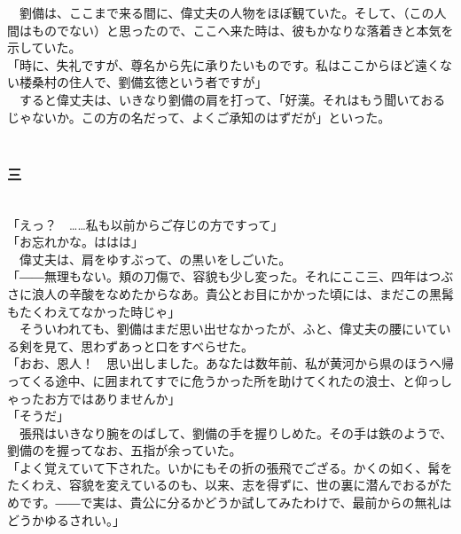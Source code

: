 \documentclass[
  paper=a5,
  fontsize=10pt,
  jafontsize=9.5pt,
  tate,                  %
  open_bracket_pos=nibu, %
]{jlreq}
\begin{document}
　劉備は、ここまで来る間に、偉丈夫の人物をほぼ観ていた。そして、（この人間はものでない）と思ったので、ここへ来た時は、彼もかなりな落着きと本気を示していた。\\


「時に、失礼ですが、尊名から先に承りたいものです。私はここからほど遠くない楼桑村の住人で、劉備玄徳という者ですが」\\


　すると偉丈夫は、いきなり劉備の肩を打って、「好漢。それはもう聞いておるじゃないか。この方の名だって、よくご承知のはずだが」といった。\\

\\

\subsubsection{三}

\\


「えっ？　……私も以前からご存じの方ですって」\\


「お忘れかな。ははは」\\


　偉丈夫は、肩をゆすぶって、の黒いをしごいた。\\


「――無理もない。頬の刀傷で、容貌も少し変った。それにここ三、四年はつぶさに浪人の辛酸をなめたからなあ。貴公とお目にかかった頃には、まだこの黒髯もたくわえてなかった時じゃ」\\


　そういわれても、劉備はまだ思い出せなかったが、ふと、偉丈夫の腰にいている剣を見て、思わずあっと口をすべらせた。\\


「おお、恩人！　思い出しました。あなたは数年前、私が黄河から県のほうへ帰ってくる途中、に囲まれてすでに危うかった所を助けてくれたの浪士、と仰っしゃったお方ではありませんか」\\


「そうだ」\\


　張飛はいきなり腕をのばして、劉備の手を握りしめた。その手は鉄のようで、劉備のを握ってなお、五指が余っていた。\\


「よく覚えていて下された。いかにもその折の張飛でござる。かくの如く、髯をたくわえ、容貌を変えているのも、以来、志を得ずに、世の裏に潜んでおるがためです。――で実は、貴公に分るかどうか試してみたわけで、最前からの無礼はどうかゆるされい。」\\
\end{document}
